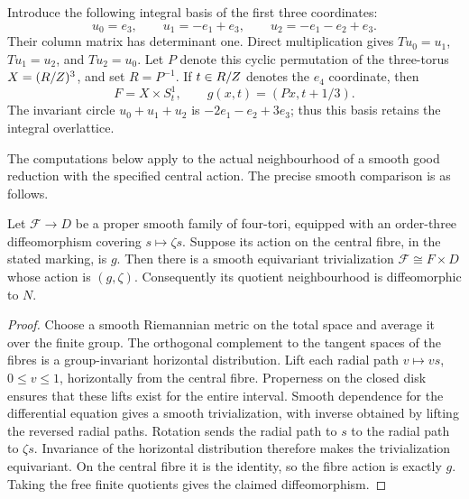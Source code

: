 Introduce the following integral basis of the first three coordinates:
\begin{equation}\label{marked-local:eq:permutation-basis}
 u_0=e_3,\qquad u_1=-e_1+e_3,\qquad
 u_2=-e_1-e_2+e_3.
\end{equation}
Their column matrix has determinant one. Direct multiplication gives
$Tu_0=u_1$, $Tu_1=u_2$, and $Tu_2=u_0$.
Let $P$ denote this cyclic permutation of the three-torus
$X=(R/Z)^3$, and set $R=P^{-1}$.
If $t\in R/Z$ denotes the $e_4$ coordinate, then
\begin{equation}\label{marked-local:eq:affine-product}
 F=X\times S^1_t,\qquad g(x,t)=(Px,t+1/3).
\end{equation}
The invariant circle $u_0+u_1+u_2$ is
$-2e_1-e_2+3e_3$; thus this basis retains the integral overlattice.

The computations below apply to the actual neighbourhood of a smooth
good reduction with the specified central action. The precise smooth
comparison is as follows.

\begin{proposition}\label{marked-local:prop:family}
Let $\mathcal F\to D$ be a proper smooth family of four-tori,
equipped with an order-three diffeomorphism covering $s\mapsto\zeta s$.
Suppose its action on the central fibre, in the stated marking, is $g$.
Then there is a smooth equivariant trivialization
$\mathcal F\cong F\times D$ whose action is $(g,\zeta)$.
Consequently its quotient neighbourhood is diffeomorphic to $N$.
\end{proposition}
\begin{proof}
Choose a smooth Riemannian metric on the total space and average it
over the finite group. The orthogonal complement to the tangent spaces
of the fibres is a group-invariant horizontal distribution. Lift each
radial path $v\mapsto vs$, $0\le v\le1$, horizontally from the
central fibre. Properness on the closed disk ensures that these lifts
exist for the entire interval. Smooth dependence for the differential
equation gives a smooth trivialization, with inverse obtained by lifting
the reversed radial paths. Rotation sends the radial path to $s$ to
the radial path to $\zeta s$. Invariance of the horizontal distribution
therefore makes the trivialization equivariant. On the central fibre
it is the identity, so the fibre action is exactly $g$.
Taking the free finite quotients gives the claimed diffeomorphism.
\end{proof}

